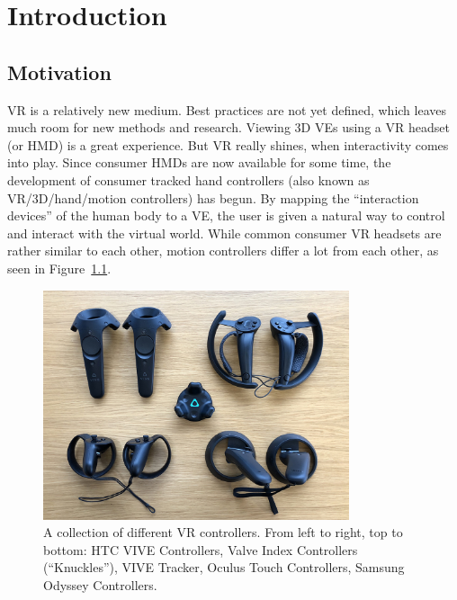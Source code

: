 \chapter{Introduction}\label{chapter:introduction}

\section{Motivation}\label{section:motivation}

\begin{sloppypar}%
  \ac{VR} is a relatively new medium. Best practices are not yet defined, which leaves much room for new methods and research. Viewing \ac{3D} \acp{VE} using a \ac{VR} headset (or \ac{HMD}) is a great experience. But \ac{VR} really shines, when interactivity comes into play. Since consumer \acp{HMD} are now available for some time, the development of consumer tracked hand controllers (also known as \ac{VR}/\ac{3D}/hand/motion controllers) has begun. By mapping the \enquote{interaction devices} of the human body to a \ac{VE}, the user is given a natural way to control and interact with the virtual world. While common consumer \ac{VR} headsets are rather similar to each other, motion controllers differ a lot from each other, as seen in Figure~\ref{fig:vr-controllers}.
\end{sloppypar}%

\begin{figure}[H]%
  \centering%
  \includegraphics[width=9cm]{figures/vr_controllers.jpg}%
  \caption[Collection of VR controllers]{A collection of different \ac{VR} controllers. From left to right, top to bottom: HTC VIVE Controllers, Valve Index Controllers (\enquote{Knuckles}), VIVE Tracker, Oculus Touch Controllers, Samsung Odyssey Controllers.}\label{fig:vr-controllers}
\end{figure}

